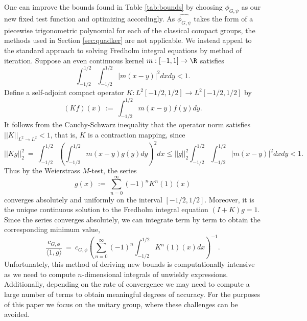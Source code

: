\documentclass[12pt, reqno]{amsart}
\numberwithin{equation}{section}
\theoremstyle{definition}
\theoremstyle{remark}
\begin{document}
One can improve the bounds found in Table \ref{tab:bounds} by choosing $\phi_{G, \psi}$ as our new fixed test function and optimizing accordingly. As $\widehat{\phi_{G, \psi}}$ takes the form of a piecewise trigonometric polynomial for each of the classical compact groups, the methods used in Section \ref{sec:quadker} are not applicable. We instead appeal to the standard approach to solving Fredholm integral equations by method of iteration. Suppose an even continuous kernel $m: [-1, 1] \to \R$ satisfies
	\begin{equation}
		\int_{-1/2}^{1/2} \int_{-1/2}^{1/2} |m(x - y)|^2 dx dy < 1.
	\end{equation}
Define a self-adjoint compact operator $K: L^2 [-1/2, 1/2] \to L^2[-1/2, 1/2]$ by
	\begin{equation}
		(Kf)(x) \ := \  \int_{-1/2}^{1/2} m(x - y) f(y) dy.
	\end{equation}
It follows from the Cauchy-Schwarz inequality that the operator norm satisfies $||K||_{L^2 \to L^2} < 1$, that is, $K$ is a contraction mapping, since
	\begin{equation}
		||Kg||_2^2 \ = \  \int_{-1/2}^{1/2} \left( \int_{-1/2}^{1/2} m(x - y) g(y) dy \right)^2 dx \leq ||g||_2^2 \int_{-1/2}^{1/2} \int_{-1/2}^{1/2} |m(x - y)|^2 dx dy < 1.
	\end{equation}	
Thus by the Weierstrass $M$-test, the series
	\begin{equation}
		g(x) \ := \  \sum_{n = 0}^\infty (-1)^n K^n (1)(x) \label{eq:series}
	\end{equation}
converges absolutely and uniformly on the interval $[-1/2, 1/2]$. Moreover, it is the unique continuous solution to the Fredholm integral equation $(I + K) g = 1$. Since the series converges absolutely, we can integrate term by term to obtain the corresponding minimum value,
	\begin{equation}
		\frac{c_{G, \phi}}{\langle 1, g \rangle} \ = \  c_{G, \phi}\left( \sum_{n = 0}^\infty (-1)^n \int_{-1/2}^{1/2} K^n (1) (x) dx \right)^{-1}. \label{eq:seriesmin}
	\end{equation}
Unfortunately, this method of deriving new bounds is computationally intensive as we need to compute $n$-dimensional integrals of unwieldy expressions. Additionally, depending on the rate of convergence we may need to compute a large number of terms to obtain meaningful degrees of accuracy. For the purposes of this paper we focus on the unitary group, where these challenges can be avoided.
\end{document}
